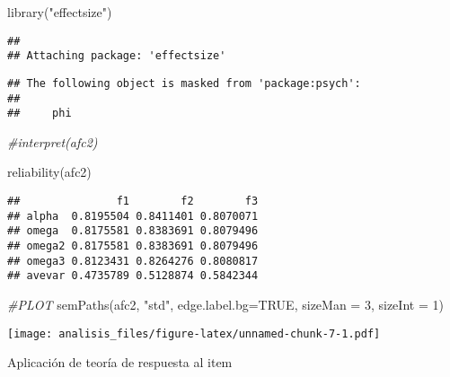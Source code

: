 \documentclass[
]{article}
\newenvironment{Shaded}{\begin{snugshade}}{\end{snugshade}}
\newcommand{\AttributeTok}[1]{\textcolor[rgb]{0.77,0.63,0.00}{#1}}
\newcommand{\CommentTok}[1]{\textcolor[rgb]{0.56,0.35,0.01}{\textit{#1}}}
\newcommand{\ConstantTok}[1]{\textcolor[rgb]{0.00,0.00,0.00}{#1}}
\newcommand{\DecValTok}[1]{\textcolor[rgb]{0.00,0.00,0.81}{#1}}
\newcommand{\FunctionTok}[1]{\textcolor[rgb]{0.00,0.00,0.00}{#1}}
\newcommand{\NormalTok}[1]{#1}
\newcommand{\StringTok}[1]{\textcolor[rgb]{0.31,0.60,0.02}{#1}}
\begin{document}
\begin{Shaded}
\begin{Highlighting}[]
\FunctionTok{library}\NormalTok{(}\StringTok{"effectsize"}\NormalTok{)}
\end{Highlighting}
\end{Shaded}

\begin{verbatim}
## 
## Attaching package: 'effectsize'
\end{verbatim}

\begin{verbatim}
## The following object is masked from 'package:psych':
## 
##     phi
\end{verbatim}

\begin{Shaded}
\begin{Highlighting}[]
\CommentTok{\#interpret(afc2)}

\FunctionTok{reliability}\NormalTok{(afc2)}
\end{Highlighting}
\end{Shaded}

\begin{verbatim}
##               f1        f2        f3
## alpha  0.8195504 0.8411401 0.8070071
## omega  0.8175581 0.8383691 0.8079496
## omega2 0.8175581 0.8383691 0.8079496
## omega3 0.8123431 0.8264276 0.8080817
## avevar 0.4735789 0.5128874 0.5842344
\end{verbatim}

\begin{Shaded}
\begin{Highlighting}[]
\CommentTok{\#PLOT}
\FunctionTok{semPaths}\NormalTok{(afc2,  }\StringTok{"std"}\NormalTok{,   }\AttributeTok{edge.label.bg=}\ConstantTok{TRUE}\NormalTok{, }\AttributeTok{sizeMan =} \DecValTok{3}\NormalTok{, }\AttributeTok{sizeInt =} \DecValTok{1}\NormalTok{)}
\end{Highlighting}
\end{Shaded}

\texttt{[image: analisis\_files/figure-latex/unnamed-chunk-7-1.pdf]}

Aplicación de teoría de respuesta al item
\end{document}
